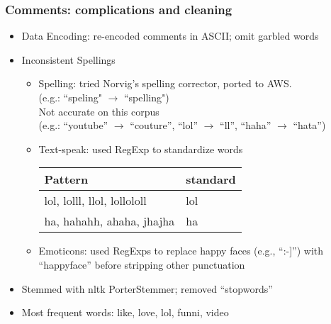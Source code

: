 \documentclass[fleqn]{beamer}
\begin{document}
\begin{frame}
\frametitle{Comments: complications and cleaning}
    \begin{itemize}
   	\item Data Encoding: re-encoded comments in ASCII; omit garbled words
        \item Inconsistent Spellings 
        	\begin{itemize}
		\item Spelling: tried Norvig's spelling corrector, ported to AWS. \\
		(e.g.: ``speling"  $\rightarrow$ ``spelling")\\
                Not accurate on this corpus\\
                  (e.g.: ``youtube'' $\rightarrow$ ``couture'', 
                    ``lol'' $\rightarrow$ ``ll'', ``haha'' $\rightarrow$ ``hata'')
                   \item Text-speak:  used RegExp to standardize words\\
		\begin{center}
        			\begin{tabular}{ | l | l |}
			\hline
			Pattern & standard \\ \hline
			lol, lolll, llol, lollololl & lol \\ \hline
			ha, hahahh, ahaha, jhajha & ha \\
			\hline
			\end{tabular}
					
      		\end{center}
		\item Emoticons: used RegExps to replace happy faces (e.g., ``:-]'') with 
                ``happyface'' 
                  before stripping other punctuation
	\end{itemize}
                \item Stemmed with nltk PorterStemmer; removed ``stopwords''
                \item Most frequent words: like, love, lol, funni, video
    \end{itemize}
\end{frame}
\end{document}
